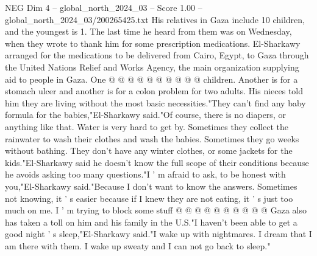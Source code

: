 \begin{textsample}{NEG Dim 4 – global\_north\_2024\_03 – Score 1.00 – global\_north\_2024\_03/200265425.txt}
His relatives in Gaza include 10 children, and the youngest is 1.
The last time he heard from them was on Wednesday, when they wrote to thank him for some prescription medications.
El-Sharkawy arranged for the medications to be delivered from Cairo, Egypt, to Gaza through the United Nations Relief and Works Agency, the main organization supplying aid to people in Gaza.
One @ @ @ @ @ @ @ @ @ @ children.
Another is for a stomach ulcer and another is for a colon problem for two adults.
His nieces told him they are living without the most basic necessities."They can't find any baby formula for the babies,"El-Sharkawy said."Of course, there is no diapers, or anything like that.
Water is very hard to get by.
Sometimes they collect the rainwater to wash their clothes and wash the babies.
Sometimes they go weeks without bathing.
They don't have any winter clothes, or some jackets for the kids."El-Sharkawy said he doesn't know the full scope of their conditions because he avoids asking too many questions."I ' m afraid to ask, to be honest with you,"El-Sharkawy said."Because I don't want to know the answers.
Sometimes not knowing, it ' s easier because if I knew they are not eating, it ' s just too much on me.
I ' m trying to block some stuff @ @ @ @ @ @ @ @ @ @ Gaza also has taken a toll on him and his family in the U.S."I haven't been able to get a good night ' s sleep,"El-Sharkawy said."I wake up with nightmares.
I dream that I am there with them.
I wake up sweaty and I can not go back to sleep."

\end{textsample}
